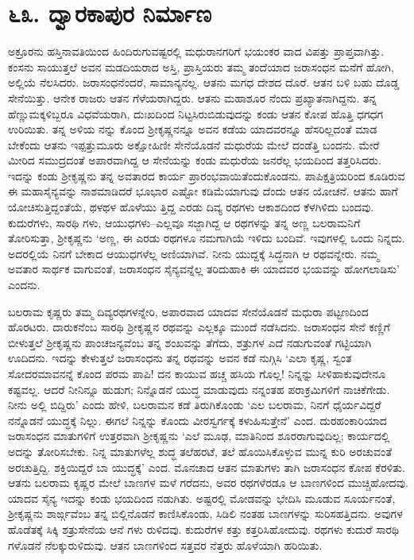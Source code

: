 
\chapter{೬೩. ದ್ವಾರಕಾಪುರ ನಿರ್ಮಾಣ}

ಅಕ್ರೂರನು ಹಸ್ತಿನಾವತಿಯಿಂದ ಹಿಂದಿರುಗುವಷ್ಟರಲ್ಲಿ ಮಧುರಾನಗರಿಗೆ ಭಯಂಕರ ವಾದ ವಿಪತ್ತು ಪ್ರಾಪ್ತವಾಗಿತ್ತು. ಕಂಸನು ಸಾಯುತ್ತಲೆ ಅವನ ಮಡದಿಯರಾದ ಅಸ್ತಿ, ಪ್ರಾಸ್ತಿಯರು ತಮ್ಮ ತಂದೆಯಾದ ಜರಾಸಂಧನ ಮನೆಗೆ ಹೋಗಿ, ಅಲ್ಲಿಯೆ ನೆಲಸಿದರು. ಜರಾಸಂಧನೆಂದರೆ, ಸಾಮಾನ್ಯನಲ್ಲ. ಆತನು ಮಗಧ ದೇಶದ ದೊರೆ. ಆತನ ಬಳಿ ಬಹು ದೊಡ್ಡ ಸೇನೆಯಿತ್ತು. ಆನೇಕ ರಾಜರು ಆತನ ಗೆಳೆಯರಾಗಿದ್ದರು. ಆತನು ಮಹಾಶೂರ ನೆಂದು ಪ್ರಖ್ಯಾತನಾಗಿದ್ದನು. ತನ್ನ ಹೆಣ್ಣುಮಕ್ಕಳಿಬ್ಬರೂ ವಿಧವೆಯರಾಗಿ, ದುಃಖದಿಂದ ನಿಟ್ಟಸಿರುಬಿಡುವುದನ್ನು ಕಂಡು ಆತನ ಕೋಪ ಹೊತ್ತಿ ಧಗಧಗ ಉರಿಯಿತು. ತನ್ನ ಅಳಿಯ ನನ್ನು ಕೊಂದ ಶ್ರೀಕೃಷ್ಣನನ್ನೂ ಅವನ ಕಡೆಯ ಯಾದವರನ್ನೂ ಹೆಸರಿಲ್ಲದಂತೆ ಮಾಡ ಬೇಕೆಂದು ಆತನು ಇಪ್ಪತ್ತುಮೂರು ಅಕ್ಷೋಹಿಣೀ ಸೇನೆಯೊಡನೆ ಮಧುರೆಯ ಮೇಲೆ ದಂಡೆತ್ತಿ ಬಂದನು. ಮೇರೆ ಮೀರಿದ ಸಮುದ್ರದಂತೆ ಅಪಾರವಾಗಿದ್ದ ಆ ಸೇನೆಯನ್ನು ಕಂಡು ಮಧುರೆಯ ಜನರೆಲ್ಲ ಭಯದಿಂದ ತತ್ತರಿಸಿದರು. ಇದನ್ನು ಕಂಡು ಶ್ರೀಕೃಷ್ಣನು ತನ್ನ ಅವತಾರದ ಕಾರ್ಯ ಪ್ರಾರಂಭವಾಯಿತೆಂದುಕೊಂಡನು. ಪಾಪಿಕ್ಷತ್ರಿಯರಿಂದ ಕೂಡಿರುವ ಈ ಮಹಾಸೈನ್ಯವನ್ನು ನಾಶಮಾಡಿದರೆ ಭೂಭಾರ ಎಷ್ಟೋ ಕಡಿಮೆಯಾಗುವು ದೆಂದು ಆತನ ಯೋಚನೆ. ಆತನು ಹಾಗೆ ಯೋಚಿಸುತ್ತಿದ್ದಂತೆಯೆ, ಥಳಥಳ ಹೊಳೆಯು ತ್ತಿದ್ದ ಎರಡು ದಿವ್ಯ ರಥಗಳು ಆಕಾಶದಿಂದ ಕೆಳಗಿಳಿದು ಬಂದವು. ಕುದುರೆಗಳು, ಸಾರಥಿ ಗಳು, ಆಯುಧಗಳು–ಎಲ್ಲವೂ ಸಜ್ಜಾಗಿದ್ದ ಆ ರಥಗಳನ್ನು ತನ್ನ ಅಣ್ಣ ಬಲರಾಮನಿಗೆ ತೋರಿಸುತ್ತಾ, ಶ್ರೀಕೃಷ್ಣನು ‘ಅಣ್ಣ, ಈ ಎರಡು ರಥಗಳೂ ನಮಗಾಗಿಯೆ ಇಳಿದು ಬಂದಿವೆ. ಇವುಗಳಲ್ಲಿ ಒಂದು ನಿನ್ನದು. ಅದರಲ್ಲಿಯೆ ನಿನಗೆ ಬೇಕಾದ ಆಯುಧಗಳೆಲ್ಲ ಅಣಿಯಾಗಿವೆ. ನೀನು ಯುದ್ದಕ್ಕೆ ಸಿದ್ಧನಾಗಿ ಆ ರಥವನ್ನೇರು. ನಮ್ಮ ಅವತಾರ ಸಾರ್ಥಕ ವಾಗುವಂತೆ, ಜರಾಸಂಧನ ಸೈನ್ಯವನ್ನೆಲ್ಲ ತರಿದುಹಾಕಿ ಈ ಯಾದವರ ಭಯವನ್ನು ಹೋಗಲಾಡಿಸು’ ಎಂದನು.

ಬಲರಾಮ ಕೃಷ್ಣರು ತಮ್ಮ ದಿವ್ಯರಥಗಳನ್ನೇರಿ, ಅಪಾರವಾದ ಯಾದವ ಸೇನೆಯೊಡನೆ ಮಧುರಾ ಪಟ್ಟಣದಿಂದ ಹೊರಟರು. ದಾರುಕನೆಂಬ ಸಾರಥಿ ಶ್ರೀಕೃಷ್ಣನ ರಥವನ್ನು ಎಲ್ಲಕ್ಕೂ ಮುಂದೆ ನಡೆಸಿದನು. ಜರಾಸಂಧನ ಸೇನೆ ಕಣ್ಣಿಗೆ ಬೀಳುತ್ತಲೆ ಶ್ರೀಕೃಷ್ಣನು ಪಾಂಚಜನ್ಯವೆಂಬ ತನ್ನ ಶಂಖವನ್ನು ತೆಗೆದು, ಶತ್ರುಗಳ ಎದೆ ನಡುಗುವಂತೆ ಗಟ್ಟಿಯಾಗಿ ಊದಿದನು. ಇದನ್ನು ಕೇಳುತ್ತಲೆ ಜರಾಸಂಧನು ತನ್ನ ರಥವನ್ನು ಅವನ ಕಡೆ ನುಗ್ಗಿಸಿ ‘ಎಲಾ ಕೃಷ್ಣ, ಸ್ವಂತ ಸೋದರಮಾವನನ್ನೆ ಕೊಂದ ಪರಮ ಪಾಪಿ! ದನ ಕಾಯುವ ಹಚ್ಚ ಹಸಿಯ ಗೊಲ್ಲ! ನಿನ್ನನ್ನು ಸೀಳಿಹಾಕುವುದೇನೂ ಕಷ್ಟವಲ್ಲ. ಆದರೆ ನೀನಿನ್ನೂ ಹುಡುಗ; ನಿನ್ನೊಡನೆ ಯುದ್ಧ ಮಾಡುವುದು ನನ್ನಂತಹ ಪರಾಕ್ರಮಿಗಳಿಗೆ ನಾಚಿಕೆಗೇಡು. ನೀನು ಅಲ್ಲಿ ಬಿದ್ದಿರು’ ಎಂದು ಹೇಳಿ, ಬಲರಾಮನ ಕಡೆ ತಿರುಗಿಕೊಂಡು ‘ಎಲ ಬಲರಾಮ, ನಿನಗೆ ಧೈರ್ಯವಿದ್ದರೆ ನನ್ನೊಡನೆ ಯುದ್ಧಕ್ಕೆ ನಿಲ್ಲು. ಈಗಲೆ ನಿನ್ನನ್ನು ಕೊಂದು ವೀರಸ್ವರ್ಗಕ್ಕೆ ಕಳುಹಿಸುತ್ತೇನೆ’ ಎಂದ. ದುರಹಂಕಾರಿಯಾದ ಜರಾಸಂಧನ ಮಾತುಗಳಿಗೆ ಉತ್ತರವಾಗಿ ಶ್ರೀಕೃಷ್ಣನು ‘ಎಲೆ ಮೂಢ, ಮಾತಿನಿಂದ ಶೂರರಾಗುವುದಿಲ್ಲ; ಕಾರ್ಯದಲ್ಲಿ ಅದನ್ನು ತೋರಿಸಬೇಕು. ನಿನ್ನ ಮಾತುಗಳೆಲ್ಲ ಶುದ್ಧ ತಲೆಹರಟೆ, ತಲೆ ಹೊಯಿಸಿಕೊಳ್ಳುವ ಮುನ್ನ ಕುರಿ ಅರಚುವಂತೆ ಅರಚುತ್ತಿದ್ದಿ. ಶಕ್ತಿಯಿದ್ದರೆ ಬಾ ಯುದ್ಧಕ್ಕೆ’ ಎಂದ. ಮೊನಚಾದ ಆತನ ಮಾತುಗಳು ತಾಗಿ ಜರಾಸಂಧನ ಕೋಪ ಕೆರಳಿತು. ಆತನು ಬಲರಾಮ ಕೃಷ್ಣರ ಮೇಲೆ ಬಾಣಗಳ ಮಳೆ ಗರೆದನು, ಅವರ ರಥಗಳೆರಡೂ ಆ ಬಾಣಗಳಿಂದ ಮುಚ್ಚಿಹೋದವು. ಯಾದವ ಸೈನ್ಯ ಇದನ್ನು ಕಂಡು ಭಯದಿಂದ ನಡುಗಿತು. ಅಷ್ಟರಲ್ಲಿ ಮೋಡವನ್ನು ಭೇದಿಸಿ ಮೂಡುವ ಸೂರ್ಯನಂತೆ, ಶ್ರೀಕೃಷ್ಣನು ಶಾರ್ಙ್ಗವೆಂಬ ತನ್ನ ಬಿಲ್ಲಿನೊಡನೆ ಕಾಣಿಸಿಕೊಂಡು, ಸಿಡಿಲಿ ನಂತಹ ಬಾಣಗಳನ್ನು ಸುರಿಸಹತ್ತಿದನು. ಅವುಗಳ ಹೊಡೆತಕ್ಕೆ ಸಿಕ್ಕಿ ಶತ್ರುಸೇನೆಯ ಆನೆ ಗಳು ರುಳಿದವು. ಕುದುರೆಗಳ ಕತ್ತು ಕತ್ತರಿಸಿಹೋದುವು. ರಥಗಳು ಕುದುರೆ ಸಾರಥಿ ಗಳೊಡನೆ ನೆಲಕ್ಕುರುಳಿದುವು. ಆತನ ಬಾಣಗಳಿಂದ ಸತ್ತವರ ನೆತ್ತರು ಹೊಳೆಯಾಗಿ ಹರಿಯಿತು.

